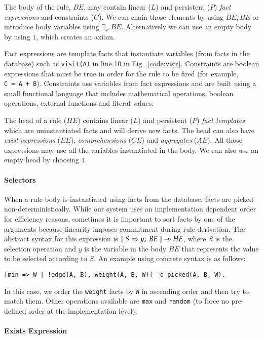 The body of the rule, $BE$, may contain linear ($L$) and persistent ($P$) \emph{fact expressions} and
constraints ($C$). We can chain those elements by using $BE, BE$ or introduce body variables using $\exists_{x}. BE$.
Alternatively we can use an empty body by using $1$, which creates an axiom.

Fact expressions are template facts that instantiate variables
(from facts in the database) such as \texttt{visit(A)} in line 10 in Fig.~\ref{code:visit}.
Constraints are boolean expressions that must
be true in order for the rule to be fired (for example, \texttt{C~=~A~+~B}). Constraints use variables from fact expressions and are built using a small functional language that includes mathematical operations, boolean operations, external functions and literal values.

The head of a rule ($HE$) contains linear ($L$) and persistent ($P$) \emph{fact templates} which are uninstantiated facts and will derive new facts. The head can also have \emph{exist expressions} ($EE$), \emph{comprehensions} ($CE$) and \emph{aggregates} ($AE$). All those expressions
may use all the variables instantiated in the body. We can also use an empty head by choosing $1$.

\paragraph{Selectors}

When a rule body is instantiated using facts from the database, facts are picked
non-deterministically. While our system uses an implementation dependent order for
efficiency reasons, sometimes it is important to sort facts by one of the arguments
because linearity imposes commitment during rule derivation. The abstract syntax for
this expression is $[\; S \Rightarrow y; \; BE \;] \multimap HE$, where $S$ is the selection operation and $y$ is the
variable in the body $BE$ that represents the value to be selected according to $S$.
An example using concrete syntax is as follows:

\begin{Verbatim}
[min => W | !edge(A, B), weight(A, B, W)] -o picked(A, B, W).
\end{Verbatim}

In this case, we order the \texttt{weight} facts by \texttt{W} in ascending order and then try
to match them. Other operations available are \texttt{max} and \texttt{random} (to force no pre-defined order at the
implementation level).

\paragraph{Exists Expression}

